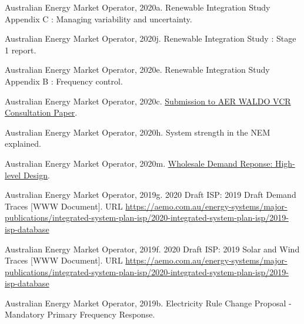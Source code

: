 \documentclass[12pt,a4paper,]{report}
\newlength{\cslhangindent}
\newenvironment{CSLReferences}[2] %
 {%
  \setlength{\parindent}{0pt}
  \ifodd #1 \everypar{\setlength{\hangindent}{\cslhangindent}}\ignorespaces\fi
  \ifnum #2 > 0
  \setlength{\parskip}{#2\baselineskip}
  \fi
 }%
 {}
\begin{document}
\begin{CSLReferences}{1}{0}
\leavevmode{}%
Australian Energy Market Operator, 2020a. Renewable {Integration Study
Appendix C} : {Managing} variability and uncertainty.

\leavevmode{}%
Australian Energy Market Operator, 2020j. Renewable {Integration Study}
: {Stage} 1 report.

\leavevmode{}%
Australian Energy Market Operator, 2020e. Renewable {Integration Study
Appendix B} : {Frequency} control.

\leavevmode{}%
Australian Energy Market Operator, 2020c.
\href{https://www.aer.gov.au/system/files/AEMO\%20-\%20Submission\%20to\%20AER\%20WALDO\%20VCR\%20Consultation\%20Paper\%20-\%20March\%202020.pdf}{Submission
to {AER WALDO VCR Consultation Paper}}.

\leavevmode{}%
Australian Energy Market Operator, 2020h. System strength in the {NEM}
explained.

\leavevmode{}%
Australian Energy Market Operator, 2020m.
\href{https://www.aemo.com.au/-/media/files/initiatives/submissions/2020/wdrm/wdrm-high-level-design-june-2020.pdf}{Wholesale
{Demand Reponse}: {High-level Design}}.

\leavevmode{}%
Australian Energy Market Operator, 2019g. 2020 {Draft ISP}: 2019 {Draft
Demand Traces} {[}WWW Document{]}. URL
\url{https://aemo.com.au/energy-systems/major-publications/integrated-system-plan-isp/2020-integrated-system-plan-isp/2019-isp-database}

\leavevmode{}%
Australian Energy Market Operator, 2019f. 2020 {Draft ISP}: 2019 {Solar}
and {Wind Traces} {[}WWW Document{]}. URL
\url{https://aemo.com.au/energy-systems/major-publications/integrated-system-plan-isp/2020-integrated-system-plan-isp/2019-isp-database}

\leavevmode{}%
Australian Energy Market Operator, 2019b. Electricity {Rule Change
Proposal} - {Mandatory Primary Frequency Response}.


\end{CSLReferences}
\end{document}
